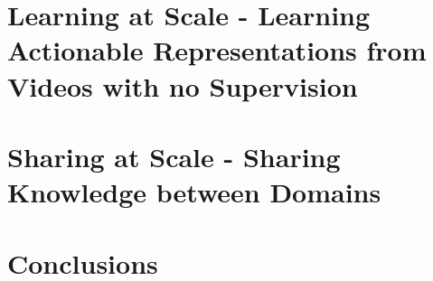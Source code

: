 \documentclass[phd,tocprelim]{cornell}
\begin{document}
\chapter{Learning at Scale - Learning Actionable Representations from Videos with no Supervision}
\label{repr}



\chapter{Sharing at Scale - Sharing Knowledge between Domains}
\label{repr2}




\chapter{Conclusions}
\label{conc}


\appendix



\end{document}

